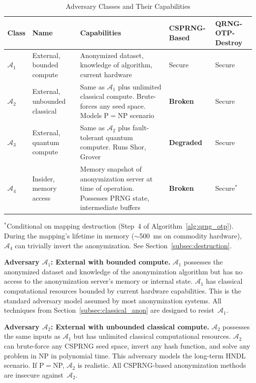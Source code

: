 \documentclass[journal]{IEEEtran}
\begin{document}
\begin{table}[t]
\caption{Adversary Classes and Their Capabilities}
\label{tab:adversaries}
\begin{center}
\begin{tabular}{@{}llp{6cm}lp{4cm}@{}}
\toprule
\textbf{Class} & \textbf{Name} & \textbf{Capabilities} & \textbf{CSPRNG-Based} & \textbf{QRNG-OTP-Destroy} \\
\midrule
$\mathcal{A}_1$ & External, bounded compute & Anonymized dataset, knowledge of algorithm, current hardware & Secure & Secure \\
$\mathcal{A}_2$ & External, unbounded classical & Same as $\mathcal{A}_1$ plus unlimited classical compute. Brute-forces any seed space. Models P$=$NP scenario & \textbf{Broken} & Secure \\
$\mathcal{A}_3$ & External, quantum compute & Same as $\mathcal{A}_2$ plus fault-tolerant quantum computer. Runs Shor, Grover & \textbf{Degraded} & Secure \\
$\mathcal{A}_4$ & Insider, memory access & Memory snapshot of anonymization server at time of operation. Possesses PRNG state, intermediate buffers & \textbf{Broken} & Secure$^*$ \\
\bottomrule
\end{tabular}
\end{center}
\vspace{1mm}
{\footnotesize $^*$Conditional on mapping destruction (Step~4 of Algorithm~\ref{alg:qrng_otp}). During the mapping's lifetime in memory (${\sim}$500~ms on commodity hardware), $\mathcal{A}_4$ can trivially invert the anonymization. See Section~\ref{subsec:destruction}.}
\end{table}

\textbf{Adversary $\mathcal{A}_1$: External with bounded compute.} $\mathcal{A}_1$ possesses the anonymized dataset and knowledge of the anonymization algorithm but has no access to the anonymization server's memory or internal state. $\mathcal{A}_1$ has classical computational resources bounded by current hardware capabilities. This is the standard adversary model assumed by most anonymization systems. All techniques from Section~\ref{subsec:classical_anon} are designed to resist~$\mathcal{A}_1$.

\textbf{Adversary $\mathcal{A}_2$: External with unbounded classical compute.} $\mathcal{A}_2$ possesses the same inputs as $\mathcal{A}_1$ but has unlimited classical computational resources. $\mathcal{A}_2$ can brute-force any CSPRNG seed space, invert any hash function, and solve any problem in NP in polynomial time. This adversary models the long-term HNDL scenario. If P$=$NP, $\mathcal{A}_2$ is realistic. All CSPRNG-based anonymization methods are insecure against~$\mathcal{A}_2$.
\end{document}
